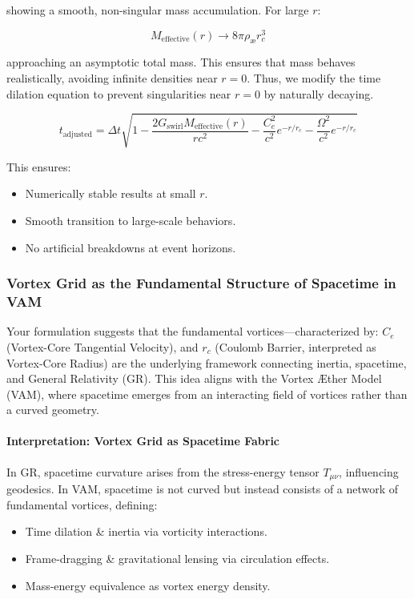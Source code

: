showing a smooth, non-singular mass accumulation. For large $r$:

\begin{equation*}
    M_{\text{effective}}(r) \to 8\pi \rho_\text{\ae} r_c^3
\end{equation*}

approaching an asymptotic total mass. This ensures that mass behaves realistically, avoiding infinite densities near $r=0$. Thus, we modify the time dilation equation to prevent singularities near $r = 0$ by naturally decaying.

\begin{equation*}
    \boxed{t_{\text{adjusted}} = \Delta t \sqrt{1 - \frac{2  G_\text{swirl} M_{\text{effective}}(r)}{r c^2} - \frac{C_e^2}{c^2} e^{-r/r_c} - \frac{\Omega^2}{c^2} e^{-r/r_c}}}
\end{equation*}

This ensures:
\begin{itemize}
    \item Numerically stable results at small $r$.
    \item Smooth transition to large-scale behaviors.
    \item No artificial breakdowns at event horizons.
\end{itemize}




\subsubsection*{Vortex Grid as the Fundamental Structure of Spacetime in VAM}
Your formulation suggests that the fundamental vortices—characterized by:
$C_e$ (Vortex-Core Tangential Velocity), and
$r_c$ (Coulomb Barrier, interpreted as Vortex-Core Radius)
are the underlying framework connecting inertia, spacetime, and General Relativity (GR). This idea aligns with the Vortex Æther Model (VAM), where spacetime emerges from an interacting field of vortices rather than a curved geometry.

\paragraph{Interpretation: Vortex Grid as Spacetime Fabric}
In GR, spacetime curvature arises from the stress-energy tensor $T_{\mu\nu}$, influencing geodesics.
In VAM, spacetime is not curved but instead consists of a network of fundamental vortices, defining:
\begin{itemize}
    \item Time dilation \& inertia via vorticity interactions.
    \item Frame-dragging \& gravitational lensing via circulation effects.
    \item Mass-energy equivalence as vortex energy density.
\end{itemize}

